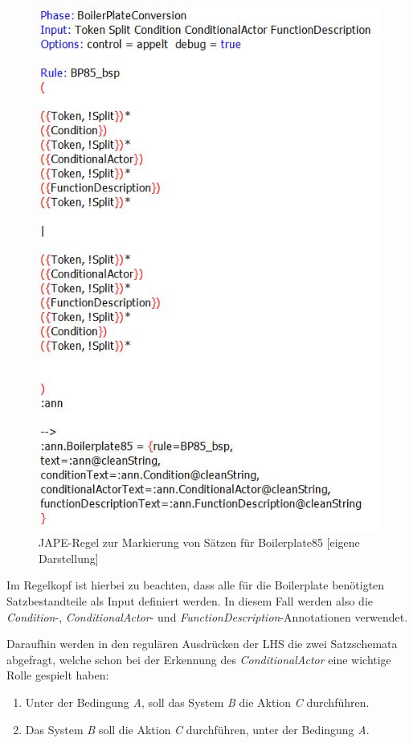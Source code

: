 \documentclass[12pt]{report}
\begin{document}
\begin{figure}[h!]
\begin{center}
\includegraphics[scale=0.8]{Bilder/Boilerplate85Jape.jpg}
\caption{JAPE-Regel zur Markierung von Sätzen für Boilerplate85 [eigene Darstellung]}
\end{center}
\end{figure}

Im Regelkopf ist hierbei zu beachten, dass alle für die Boilerplate benötigten Satzbestandteile als Input definiert werden. In diesem Fall werden also die \textit{Condition}-, \textit{ConditionalActor}- und \textit{FunctionDescription}-Annotationen verwendet. 

Daraufhin werden in den regulären Ausdrücken der LHS die zwei Satzschemata abgefragt, welche schon bei der Erkennung des \textit{ConditionalActor} eine wichtige Rolle gespielt haben:
\begin{enumerate}
\item Unter der Bedingung \textit{A}, soll das System \textit{B} die Aktion \textit{C} durchführen.
\item Das System \textit{B} soll die Aktion \textit{C} durchführen, unter der Bedingung \textit{A}.
\end{enumerate}
\end{document}
